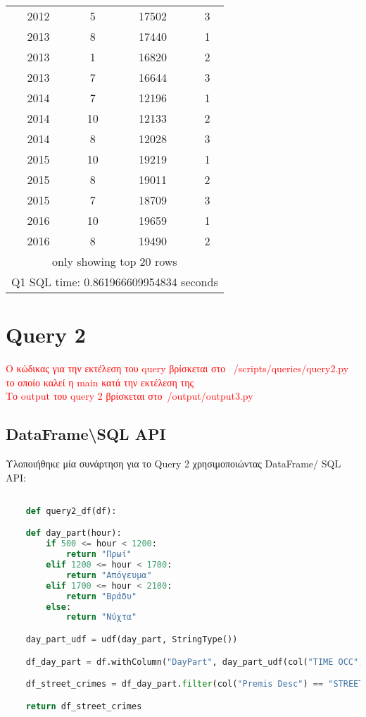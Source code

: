 \documentclass{article}
\begin{document}
\begin{center}
\begin{tabular}[t]{|c|c|c|c|}
2012 & 5 & 17502 & 3 \\
2013 & 8 & 17440 & 1 \\
2013 & 1 & 16820 & 2 \\
2013 & 7 & 16644 & 3 \\
2014 & 7 & 12196 & 1 \\
2014 & 10 & 12133 & 2 \\
2014 & 8 & 12028 & 3 \\
2015 & 10 & 19219 & 1 \\
2015 & 8 & 19011 & 2 \\
2015 & 7 & 18709 & 3 \\
2016 & 10 & 19659 & 1 \\
2016 & 8 & 19490 & 2 \\
\hline
\multicolumn{4}{|c|}{only showing top 20 rows} \\
\hline
\multicolumn{4}{|c|}{Q1 SQL time: 0.861966609954834 seconds} \\
\hline
\end{tabular}
\end{center}

\vspace{4\baselineskip}


\section{Query 2}
\textcolor{red}{Ο κώδικας για την εκτέλεση του query βρίσκεται στο  /scripts/queries/query2.py το οποίο καλεί η main κατά την εκτέλεση της} \\
\textcolor{red}{Το output του query 2 βρίσκεται στο /output/output3.py} \\

\vspace{1\baselineskip}

\subsection*{DataFrame\textbackslash SQL  API}

Υλοποιήθηκε μία συνάρτηση για το Query 2 χρησιμοποιώντας DataFrame/ SQL API:

\begin{lstlisting}[language = Python]

    def query2_df(df):

    def day_part(hour):
        if 500 <= hour < 1200:
            return "Πρωί"
        elif 1200 <= hour < 1700:
            return "Απόγευμα"
        elif 1700 <= hour < 2100:
            return "Βράδυ"
        else:
            return "Νύχτα"

    day_part_udf = udf(day_part, StringType())

    df_day_part = df.withColumn("DayPart", day_part_udf(col("TIME OCC")))

    df_street_crimes = df_day_part.filter(col("Premis Desc") == "STREET").groupBy("DayPart").count().orderBy(col("count").desc())

    return df_street_crimes
\end{lstlisting}
\end{document}

